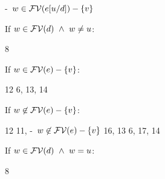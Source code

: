 \begin{bycase}
\begin{derivatioN}{7}
     {\hyp\ $w\in\mathcal{FV}(e[u/d])-\{v\}$}
\end{derivatioN}
If $w\in\mathcal{FV}(d)\ \wedge\ w\neq u$:
\begin{derivatioN}{12}
\step{\cvarv{\abs{\var}{\typ}{\esbsO{\expr}}}{\varII}=
      \setI{\var}\cup
       \cvarv{\expr}{\varII}\cup
        \cvarv{\expr}{\varI}\cup
         \cvarv{\exprI}{\varII}}
     {8}
\end{derivatioN}
If $w\in\mathcal{FV}(e)-\{v\}$:
\begin{derivatioN}{13}
\step
{\cond{\varII\neq\varI}{\cvarv{\absO}{\varII}}{\emptyset}
  \cup
   \cond{\varII\in\efvar{\exprI}}
        {\cvarv{\absO}{\varI}\cup\cvarv{\exprI}{\varII}}
        {\emptyset}
 \linK{=}
 \setI{\var}\cup\cvarv{\expr}{\varII}\cup
  \setI{\var}\cup\cvarv{\expr}{\varI}\cup
   \cvarv{\exprI}{\varII}}
{12}
\stepL
{\cvarv{\esbsO{(\absO)}}{\varII}
 \linK{=}
 \cond{\varII\neq\varI}{\cvarv{\absO}{\varII}}{\emptyset}
  \cup
   \cond{\varII\in\efvar{\exprI}}
        {\cvarv{\absO}{\varI}\cup\cvarv{\exprI}{\varII}}
        {\emptyset}}
{6, 13, 14}
\end{derivatioN}
If $w\not\in\mathcal{FV}(e)-\{v\}$:
\begin{derivatioN}{13}
\step
{\cond{\varII\neq\varI}{\cvarv{\absO}{\varII}}{\emptyset}
  \cup
   \cond{\varII\in\efvar{\exprI}}
        {\cvarv{\absO}{\varI}\cup\cvarv{\exprI}{\varII}}
        {\emptyset}
 \linK{=}
 \emptyset\cup
  \setI{\var}\cup\cvarv{\expr}{\varI}\cup
   \cvarv{\exprI}{\varII}}
{12}
\step{\varII\not\in\efvar{\expr}}
     {11, \hyp\ $w\not\in\mathcal{FV}(e)-\{v\}$}
\step{\cvarv{\abs{\var}{\typ}{\esbsO{\expr}}}{\varII}=
      \setI{\var}\cup\cvarv{\expr}{\varI}\cup\cvarv{\exprI}{\varII}}
     {16, 13}
\stepL
{\cvarv{\esbsO{(\absO)}}{\varII}
 \linK{=}
 \cond{\varII\neq\varI}{\cvarv{\absO}{\varII}}{\emptyset}
  \cup
   \cond{\varII\in\efvar{\exprI}}
        {\cvarv{\absO}{\varI}\cup\cvarv{\exprI}{\varII}}
        {\emptyset}}
{6, 17, 14}
\end{derivatioN}
If $w\in\mathcal{FV}(d)\ \wedge\ w=u$:
\begin{derivatioN}{12}
\step{\cvarv{\abs{\var}{\typ}{\esbsO{\expr}}}{\varII}=
      \setI{\var}\cup\cvarv{\expr}{\varI}\cup\cvarv{\exprI}{\varII}}
     {8}
\step
{\cond{\varII\neq\varI}{\cvarv{\absO}{\varII}}{\emptyset}
}
\end{derivatioN}
\end{bycase}
